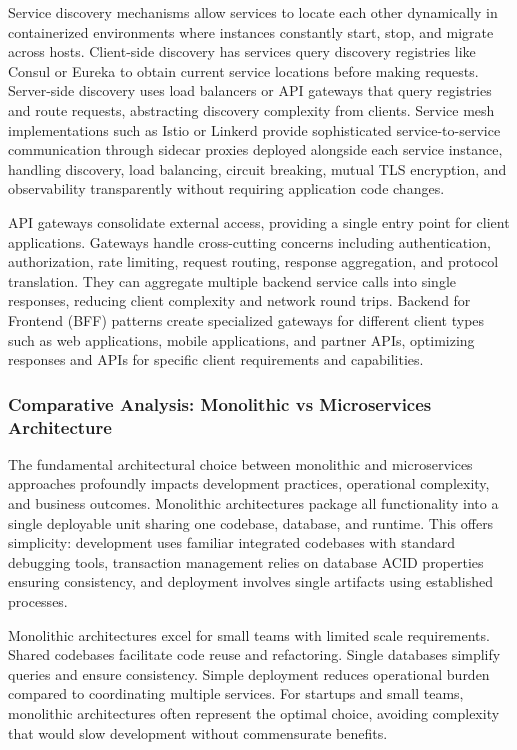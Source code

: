 \documentclass[a4paper, 12pt]{report}
\begin{document}
Service discovery mechanisms allow services to locate each other dynamically in containerized environments where instances constantly start, stop, and migrate across hosts. Client-side discovery has services query discovery registries like Consul or Eureka to obtain current service locations before making requests. Server-side discovery uses load balancers or API gateways that query registries and route requests, abstracting discovery complexity from clients. Service mesh implementations such as Istio or Linkerd provide sophisticated service-to-service communication through sidecar proxies deployed alongside each service instance, handling discovery, load balancing, circuit breaking, mutual TLS encryption, and observability transparently without requiring application code changes.

API gateways consolidate external access, providing a single entry point for client applications. Gateways handle cross-cutting concerns including authentication, authorization, rate limiting, request routing, response aggregation, and protocol translation. They can aggregate multiple backend service calls into single responses, reducing client complexity and network round trips. Backend for Frontend (BFF) patterns create specialized gateways for different client types such as web applications, mobile applications, and partner APIs, optimizing responses and APIs for specific client requirements and capabilities.

\subsubsection{Comparative Analysis: Monolithic vs Microservices Architecture}

The fundamental architectural choice between monolithic and microservices approaches profoundly impacts development practices, operational complexity, and business outcomes. Monolithic architectures package all functionality into a single deployable unit sharing one codebase, database, and runtime. This offers simplicity: development uses familiar integrated codebases with standard debugging tools, transaction management relies on database ACID properties ensuring consistency, and deployment involves single artifacts using established processes.

Monolithic architectures excel for small teams with limited scale requirements. Shared codebases facilitate code reuse and refactoring. Single databases simplify queries and ensure consistency. Simple deployment reduces operational burden compared to coordinating multiple services. For startups and small teams, monolithic architectures often represent the optimal choice, avoiding complexity that would slow development without commensurate benefits.
\end{document}
